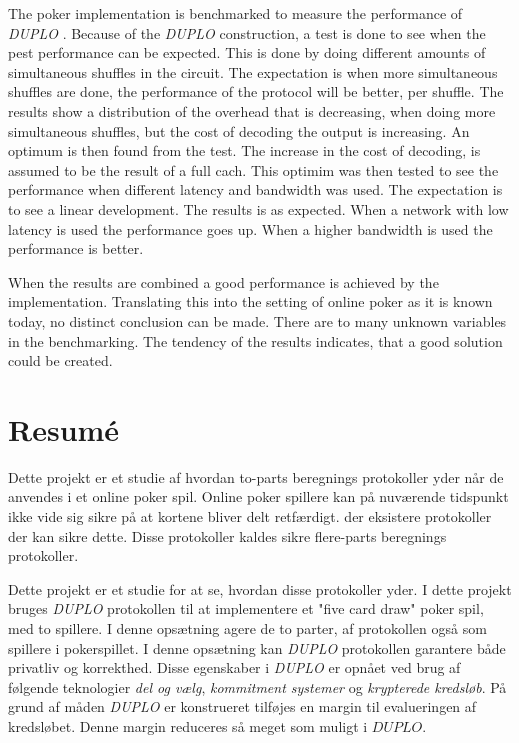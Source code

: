 \documentclass[twoside,11pt,openright]{report}
\newcommand{\DUPLO}{\textit{DUPLO} }
\begin{document}
The poker implementation is benchmarked to measure the performance of \DUPLO. Because of the \DUPLO construction, a test is done to see when the pest performance can be expected. This is done by doing different amounts of simultaneous shuffles in the circuit. The expectation is when more simultaneous shuffles are done, the performance of the protocol will be better, per shuffle. The results show a distribution of the overhead that is decreasing, when doing more simultaneous shuffles, but the cost of decoding the output is increasing. An optimum is then found from the test. The increase in the cost of decoding, is assumed to be the result of a full cach. This optimim was then tested to see the performance when different latency and bandwidth was used. The expectation is to see a linear development. The results is as expected. When a network with low latency is used the performance goes up. When a higher bandwidth is used the performance is better.

When the results are combined a good performance is achieved by the implementation. Translating this into the setting of online poker as it is known today, no distinct conclusion can be made. There are to many unknown variables in the benchmarking. The tendency of the results indicates, that a good solution could be created.


\chapter*{Resum\'e}

Dette projekt er et studie af hvordan to-parts beregnings protokoller yder når de anvendes i et online poker spil. Online poker spillere kan på nuværende tidspunkt ikke vide sig sikre på at kortene bliver delt retfærdigt. der eksistere protokoller der kan sikre dette. Disse protokoller kaldes sikre flere-parts beregnings protokoller.
 
Dette projekt er et studie for at se, hvordan disse protokoller yder. I dette projekt bruges \DUPLO protokollen til at implementere et "five card draw" poker spil, med to spillere. I denne opsætning agere de to parter, af protokollen også som spillere i pokerspillet. I denne opsætning kan \DUPLO protokollen garantere både privatliv og korrekthed. Disse egenskaber i \DUPLO er opnået ved brug af følgende teknologier \textit{del og vælg}, \textit{kommitment systemer} og \textit{krypterede kredsløb}. På grund af måden \DUPLO er konstrueret tilføjes en margin til evalueringen af kredsløbet. Denne margin reduceres så meget som muligt i $DUPLO$.
 
\end{document}
